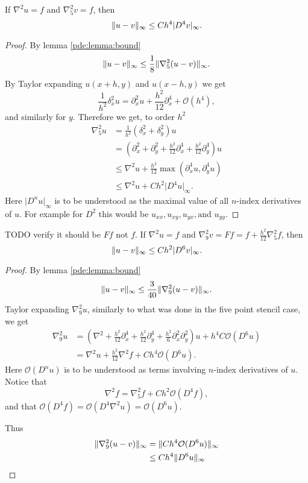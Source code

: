 \begin{theorem}
If $\nabla^2 u = f$ and $\nabla_5^2 v = f$, then
$$
\lVert u - v \rVert_\infty \leq Ch^4 \lvert D^4 v\rvert_\infty.
$$
\end{theorem}
\begin{proof}
By lemma \ref{pde:lemma:bound}
$$
\lVert u - v \rVert_\infty \leq \frac18 \lVert \nabla_5^2 (u  - v) \rVert_\infty.
$$
By Taylor expanding $u(x + h, y)$ and $u(x - h, y)$ we get
$$
\frac{1}{h^2} \delta_x^2 u = \partial_x^2 u + \frac{h^2}{12} \partial_x^4 + \mathcal{O}(h^4),
$$
and similarly for $y$.
Therefore we get, to order $h^2$
\begin{align*}
  \nabla_5^2 u
  &=\frac{1}{h^2} (\delta_x^2 + \delta_y^2) u\\
  &= (\partial_x^2 + \partial_y^2 + \frac{h^2}{12} \partial_x^4 + \frac{h^2}{12} \partial_y^4) u\\
  &\leq \nabla^2 u + \frac{h^2}{12} \max(\partial_x^4 u, \partial_y^4 u)\\
  &\leq \nabla^2 u + C h^2 \lvert D^4 u \rvert_\infty.
\end{align*}
Here $\lvert D^n u\rvert_\infty$ is to be understood as the maximal value of all $n$-index derivatives of $u$.
For example for $D^2$ this would be $u_{xx}, u_{xy}, u_{yx}, \text{and } u_{yy}$.
\end{proof}


\begin{theorem}
TODO verify it should be $F f$ not $f$.
If $\nabla^2 u = f$ and $\nabla_9^2 v = F f = f + \frac{h^2}{12} \nabla_5^2 f$, then
$$
\lVert u - v \rVert_\infty \leq Ch^2 \lvert D^6 v\rvert_\infty.
$$
\end{theorem}
\begin{proof}
By lemma \ref{pde:lemma:bound}
$$
\lVert u - v \rVert_\infty \leq \frac{3}{40} \lVert \nabla_9^2 (u  - v) \rVert_\infty.
$$
Taylor expanding $\nabla_9^2 u$, similarly to what was done in the five point stencil case, we get
\begin{align*}
  \nabla_9^2 u
  &= (\nabla^2
  + \frac{h^2}{12} \partial_x^4
  + \frac{h^2}{12} \partial_y^4
  + \frac{h^2}{6} \partial_x^2 \partial_y^2
  ) u + h^4 C \mathcal{O}(D^6 u)\\
  &= \nabla^2 u + \frac{h^2}{12} \nabla^2 f + C h^4 \mathcal{O}(D^6 u).
\end{align*}
Here $\mathcal{O}(D^n u)$ is to be understood as terms involving $n$-index derivatives of $u$.
Notice that
$$
\nabla^2 f = \nabla_5^2 f + C h^2 \mathcal{O}(D^4 f),
$$
and that $\mathcal{O}(D^4 f)
= \mathcal{O}(D^4 \nabla^2 u)
= \mathcal{O}(D^6 u)$.

Thus
\begin{align}
  \lVert \nabla_9^2 (u  - v) \rVert_\infty
  &= \lVert Ch^4 \mathcal{O}(D^6u) \rVert_\infty\\
  &\leq Ch^4 \lVert D^6u \rVert_\infty
\end{align}
\end{proof}



